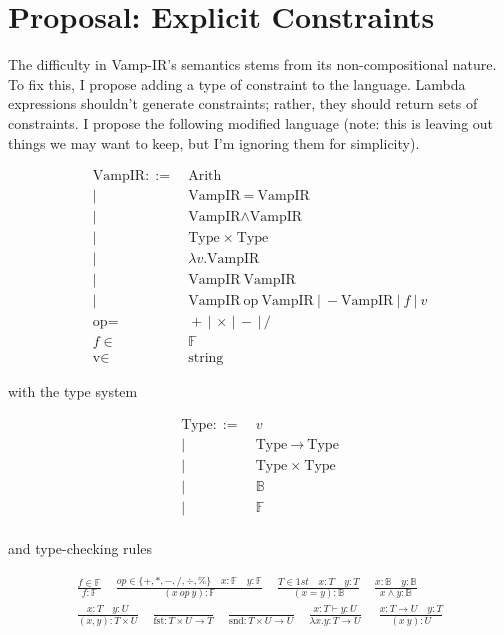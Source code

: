 \documentclass{msc}
\newcommand{\vampir}{Vamp-IR}
\begin{document}
\section{Proposal: Explicit Constraints}

The difficulty in \vampir's semantics stems from its non-compositional nature. To fix this, I propose adding a type of constraint to the language. Lambda expressions shouldn't generate constraints; rather, they should return sets of constraints. I propose the following modified language (note: this is leaving out things we may want to keep, but I'm ignoring them for simplicity).

\begin{align*}
    \text{VampIR} ::=&\ \text{Arith} \\
    |\ &\ \text{VampIR} \ = \ \text{VampIR} \\
    |\ &\ \text{VampIR} \wedge \text{VampIR} \\
    |\ &\ \text{Type} \ \times \ \text{Type} \\
    |\ &\ \lambda v . \text{VampIR} \\
    |\ &\ \text{VampIR}\ \text{VampIR} \\
    |\ &\ \text{VampIR} \ \text{op} \ \text{VampIR} \
    |\ - \text{VampIR}\ |\ f\ |\ v \\
    \text{op} =&\ + \,|\, \times \,|\, - \,|\, / \\
    f \in&\ \mathbb{F} \\
    \text{v} \in&\ \text{string}
\end{align*}

with the type system

\begin{align*}
    \text{Type} ::=&\ v \\
    |\ &\ \text{Type} \ \xrightarrow{} \ \text{Type} \\
    |\ &\ \text{Type} \ \times \ \text{Type} \\
    |\ &\ \mathbb{B} \\
    |\ &\ \mathbb{F} \\
\end{align*}

and type-checking rules

\begin{align*}
    \frac{f \in \mathbb{F}}{f : \mathbb{F}} \quad
    \frac{op \in \{+, *, -, /, \div, \% \} \quad x : \mathbb{F} \quad y : \mathbb{F} }{(x\ op\ y) : \mathbb{F}} \quad
    \frac{T \in 1st \quad x : T \quad y : T}{(x = y) : \mathbb{B}} \quad
    \frac{x : \mathbb{B} \quad y : \mathbb{B} }{x \wedge y : \mathbb{B}}\\
    \frac{x : T \quad y : U}{(x,y) : T \times U} \quad
    \frac{}{\text{fst} : T \times U \rightarrow T} \quad
    \frac{}{\text{snd} : T \times U \rightarrow U}\quad
    \frac{x : T \vdash y : U}{\lambda x.y : T \rightarrow U} \quad\
    \frac{x : T \rightarrow U \quad y : T}{(x\ y) : U} 
\end{align*}
\end{document}
